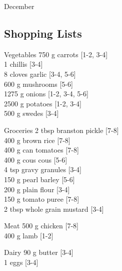 \begin{menu}{December}
    \subsection*{Shopping Lists}
      \begin{shoppinglist}{Vegetables}
      750 g carrots {\scriptsize[1-2, 3-4]}\\
      1  chillis {\scriptsize[3-4]}\\
      8 cloves garlic {\scriptsize[3-4, 5-6]}\\
      600 g mushrooms {\scriptsize[5-6]}\\
      1275 g onions {\scriptsize[1-2, 3-4, 5-6]}\\
      2500 g potatoes {\scriptsize[1-2, 3-4]}\\
      500 g swedes {\scriptsize[3-4]}\\
      \end{shoppinglist}%
      \begin{shoppinglist}{Groceries}
      2 tbsp branston pickle {\scriptsize[7-8]}\\
      400 g brown rice {\scriptsize[7-8]}\\
      400 g can tomatoes {\scriptsize[7-8]}\\
      400 g cous cous {\scriptsize[5-6]}\\
      4 tsp gravy granules {\scriptsize[3-4]}\\
      150 g pearl barley {\scriptsize[5-6]}\\
      200 g plain flour {\scriptsize[3-4]}\\
      150 g tomato puree {\scriptsize[7-8]}\\
      2 tbsp whole grain mustard {\scriptsize[3-4]}\\
      \end{shoppinglist}%
      \par\vfil %
      \begin{shoppinglist}{Meat}
      500 g chicken {\scriptsize[7-8]}\\
      400 g lamb {\scriptsize[1-2]}\\
      \end{shoppinglist}%
      \begin{shoppinglist}{Dairy}
      90 g butter {\scriptsize[3-4]}\\
      1  eggs {\scriptsize[3-4]}\\
      \end{shoppinglist}%

\end{menu}
